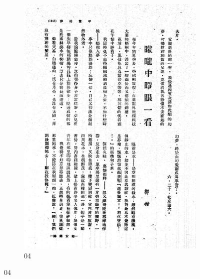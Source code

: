 \documentclass[12pt,twoside]{report}
\begin{document}
\begin{appendices}
\begin{figure}[htbp]
\begin{subfigure}[b]{0.23\linewidth}
        \includegraphics[width=\linewidth]{./figures/testset/04.jpg}
        \caption{04}
        \label{fig:test_04}
    \end{subfigure}
  

\end{figure}
\end{appendices}
\end{document}
